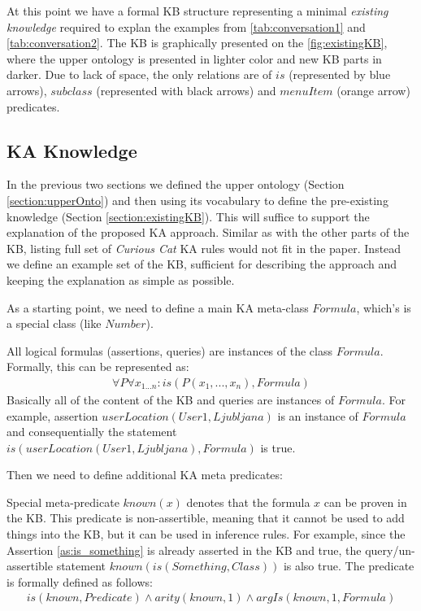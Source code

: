 At this point we have a formal KB structure representing a minimal 
\emph{existing knowledge} required to explan the examples from 
\autoref{tab:conversation1} and \autoref{tab:conversation2}. The KB is
graphically presented on the \autoref{fig:existingKB}, where the upper ontology
is presented in lighter color and new KB parts in darker. Due to lack of space,
the only relations are of $is$ (represented by blue arrows), $subclass$ 
(represented with black arrows) and $menuItem$ (orange arrow) predicates.

\subsection{KA Knowledge}
\label{section:kakb}
In the previous two sections we defined the upper ontology
(Section \ref{section:upperOnto}) and then using its vocabulary to define the 
pre-existing knowledge (Section \ref{section:existingKB}). This will suffice to
support the explanation of the proposed KA approach. Similar as with the other
parts of the KB, listing full set of 
\emph{Curious Cat} KA rules would not fit in the paper. Instead we define an 
example set of the KB, sufficient for describing the approach and keeping the 
explanation as simple as possible. 

As a starting point, we need to define a main KA meta-class $Formula$, which’s 
is a special class (like $Number$).
\begin{definition}\label{def:formula}
All logical formulas (assertions, queries) are instances of the class $Formula$.
Formally, this can be represented as:
\begin{equation}\label{as:formulas}
\begin{gathered}
	\forall P\forall x_{1...n}:is(P(x_1,...,x_n),Formula)
\end{gathered}
\end{equation}
Basically all of the content of the KB and queries are instances of $Formula$.
For example, assertion $userLocation(User1,Ljubljana)$ is an instance of 
$Formula$ and consequentially the statement $is(userLocation(User1,Ljubljana),
Formula)$ is true.
\end{definition}

Then we need to define additional KA meta predicates:

\begin{definition}\label{def:pred_known}
Special meta-predicate $known(x)$ denotes that the formula $x$ can be proven 
in the KB. This predicate is non-assertible, meaning that it cannot be used
to add things into the KB, but it can be used in inference rules. For example,
since the Assertion \ref{as:is_something} is already asserted in the KB and 
true, the query/un-assertible statement $known(is(Something,Class))$ is also 
true. The predicate is formally defined as follows:
\begin{equation}\label{as:known}
\begin{gathered}
	is(known,Predicate) \land arity(known,1) \land argIs(known,1,Formula)
\end{gathered}
\end{equation}
\end{definition}

